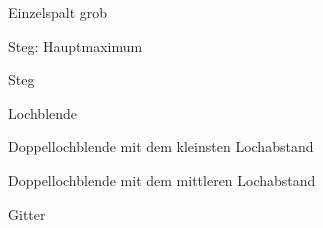 \documentclass[12pt,a4paper,titlepage,headinclude,bibtotoc]{scrartcl}
\begin{document}
\begin{figure}[!htb]
	\centering
	
	\caption{Einzelspalt grob}
\end{figure}

\begin{figure}[!htb]
	\centering
	
	\caption{Steg: Hauptmaximum}
\end{figure}

\begin{figure}[!htb]
	\centering
	
	\caption{Steg}
\end{figure}

\begin{figure}[!htb]
	\centering
	
	\caption{Lochblende}
\end{figure}

\begin{figure}[!htb]
	\centering
	
	\caption{Doppellochblende mit dem kleinsten Lochabstand}
\end{figure}

\begin{figure}[!htb]
	\centering
	
	\caption{Doppellochblende mit dem mittleren Lochabstand}
\end{figure}

\begin{figure}[!htb]
	\centering
	
	\caption{Gitter}
\end{figure}
\end{document}
